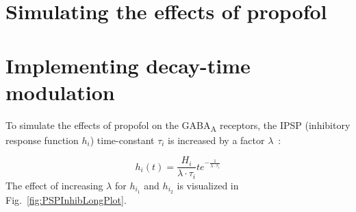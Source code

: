 \section{Simulating the effects of propofol}\label{sec:simulating-the-effects-of-propofol}


\section{Implementing decay-time modulation}\label{sec:implementing-decay-time-modulation}

To simulate the effects of propofol on the GABA\textsubscript{A}  receptors,
the IPSP (inhibitory response function $h_i$) time-constant $\tau_i$ is increased by a factor
$\lambda$~\cite{hutt_effects_2010}:


\[ h_i(t)=\frac{H_i}{\lambda \cdot \tau_i}te^{-\frac{1}{\lambda \cdot \tau_i}} \]
The effect of increasing $\lambda$ for $h_{i_1}$ and $h_{i_2}$ is visualized in Fig.~\ref{fig:PSPInhibLongPlot}.


